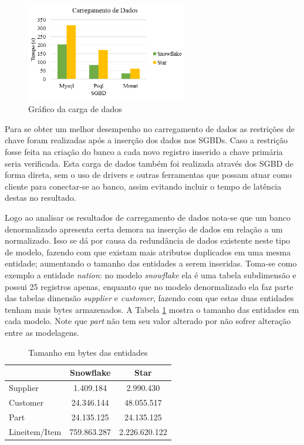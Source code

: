 \documentclass[conference]{IEEEtran}
\begin{document}
\begin{figure}[htpb]
  \centering
  \includegraphics[width=7cm]{carregamento}
  \caption{Gráfico da carga de dados}
  \label{fig:carga}
\end{figure}

Para se obter um melhor desempenho no carregamento de dados as restrições de chave foram realizadas após a inserção dos dados nos SGBDs. Caso a restrição fosse feita na criação do banco a cada novo registro inserido a chave primária seria verificada. Esta carga de dados também foi realizada através dos SGBD de forma direta, sem o uso de drivers e outras ferramentas que possam atuar como cliente para conectar-se ao banco, assim evitando incluir o tempo de latência destas no resultado.

Logo ao analisar os resultados de carregamento de dados nota-se que um banco denormalizado apresenta certa demora na inserção de dados em relação a um normalizado. Isso se dá por causa da redundância de dados existente neste tipo de modelo, fazendo com que existam mais atributos duplicados em uma mesma entidade; aumentando o tamanho das entidades a serem inseridas. Toma-se como exemplo a entidade \textit{nation}: no modelo \textit{snowflake} ela é uma tabela subdimensão e possui 25 registros apenas, enquanto que no modelo denormalizado ela faz parte das tabelas dimensão \textit{supplier} e \textit{customer}, fazendo com que estas duas entidades tenham mais bytes armazenados. A Tabela \ref{tab:tamanho} mostra o tamanho das entidades em cada modelo. Note que \textit{part} não tem seu valor alterado por não sofrer alteração entre as modelagens.

\begin{table}[htpb]
\centering
\caption{Tamanho em bytes das entidades}
\label{tab:tamanho}
\begin{tabular}{@{}lcc@{}}
\toprule
              & Snowflake & Star       \\ \midrule
Supplier      & 1.409.184   & 2.990.430    \\
Customer      & 24.346.144  & 48.055.517   \\
Part          & 24.135.125  & 24.135.125   \\
Lineitem/Item & 759.863.287 & 2.226.620.122 \\ \bottomrule
\end{tabular}
\end{table}
\end{document}
